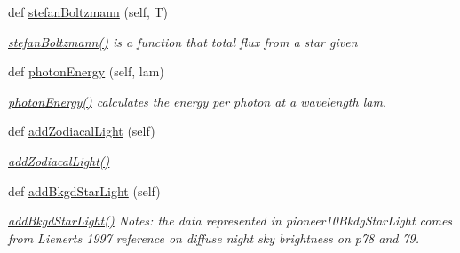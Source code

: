 \begin{DoxyCompactItemize}
def \hyperlink{classcamera_1_1image_afda16877d651ac1801fbea9fcf4583c1}{stefan\+Boltzmann} (self, T)
\begin{DoxyCompactList}\small\item\em \hyperlink{classcamera_1_1image_afda16877d651ac1801fbea9fcf4583c1}{stefan\+Boltzmann()} is a function that total flux from a star given \end{DoxyCompactList}\item 
def \hyperlink{classcamera_1_1image_a9e19e8ea8758f1cb262ca7e048e1e056}{photon\+Energy} (self, lam)
\begin{DoxyCompactList}\small\item\em \hyperlink{classcamera_1_1image_a9e19e8ea8758f1cb262ca7e048e1e056}{photon\+Energy()} calculates the energy per photon at a wavelength lam. \end{DoxyCompactList}\item 
def \hyperlink{classcamera_1_1image_aa861ed59adf2eb74ef364fe1a5e3c6db}{add\+Zodiacal\+Light} (self)
\begin{DoxyCompactList}\small\item\em \hyperlink{classcamera_1_1image_aa861ed59adf2eb74ef364fe1a5e3c6db}{add\+Zodiacal\+Light()} \end{DoxyCompactList}\item 
def \hyperlink{classcamera_1_1image_a2a423c50f436f31466814408b7d47c66}{add\+Bkgd\+Star\+Light} (self)
\begin{DoxyCompactList}\small\item\em \hyperlink{classcamera_1_1image_a2a423c50f436f31466814408b7d47c66}{add\+Bkgd\+Star\+Light()} Notes\+: the data represented in pioneer10\+Bkdg\+Star\+Light comes from Lienert\textquotesingle{}s 1997 reference on diffuse night sky brightness on p78 and 79. \end{DoxyCompactList}\end{DoxyCompactItemize}

